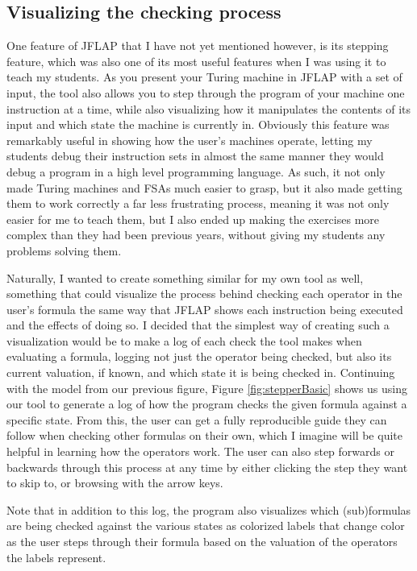 \subsection{Visualizing the checking process}

One feature of JFLAP that I have not yet mentioned however, is its stepping feature, which was also one of its most useful features when I was using it to teach my students. As you present your Turing machine in JFLAP with a set of input, the tool also allows you to step through the program of your machine one instruction at a time, while also visualizing how it manipulates the contents of its input and which state the machine is currently in. Obviously this feature was remarkably useful in showing how the user's machines operate, letting my students debug their instruction sets in almost the same manner they would debug a program in a high level programming language. As such, it not only made Turing machines and FSAs much easier to grasp, but it also made getting them to work correctly a far less frustrating process, meaning it was not only easier for me to teach them, but I also ended up making the exercises more complex than they had been previous years, without giving my students any problems solving them.

Naturally, I wanted to create something similar for my own tool as well, something that could visualize the process behind checking each operator in the user's formula the same way that JFLAP shows each instruction being executed and the effects of doing so. I decided that the simplest way of creating such a visualization would be to make a log of each check the tool makes when evaluating a formula, logging not just the operator being checked, but also its current valuation, if known, and which state it is being checked in. Continuing with the model from our previous figure, Figure \ref{fig:stepperBasic} shows us using our tool to generate a log of how the program checks the given formula against a specific state. From this, the user can get a fully reproducible guide they can follow when checking other formulas on their own, which I imagine will be quite helpful in learning how the operators work. The user can also step forwards or backwards through this process at any time by either clicking the step they want to skip to, or browsing with the arrow keys. 

Note that in addition to this log, the program also visualizes which (sub)formulas are being checked against the various states as colorized labels that change color as the user steps through their formula based on the valuation of the operators the labels represent. 

